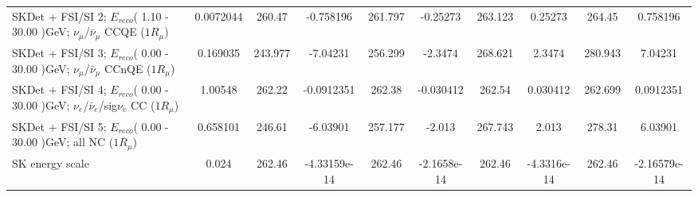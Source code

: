 \begin{tabular}{| l | S | S  S | S  S | S  S | S  S | }
SKDet + FSI/SI  2; $E_{reco}$( 1.10 - 30.00 )GeV; $\nu_{\mu}$/$\bar{\nu}_{\mu}$ CCQE ($1R_{\mu}$) &       0.0072044 &          260.47 &       -0.758196 &         261.797 &        -0.25273 &         263.123 &         0.25273 &          264.45 &        0.758196 \\ 
SKDet + FSI/SI  3; $E_{reco}$( 0.00 - 30.00 )GeV; $\nu_{\mu}$/$\bar{\nu}_{\mu}$ CCnQE ($1R_{\mu}$) &        0.169035 &         243.977 &        -7.04231 &         256.299 &         -2.3474 &         268.621 &          2.3474 &         280.943 &         7.04231 \\ 
SKDet + FSI/SI  4; $E_{reco}$( 0.00 - 30.00 )GeV; $\nu_{e}$/$\bar{\nu}_{e}$/sig$\nu_{e}$ CC ($1R_{\mu}$) &         1.00548 &          262.22 &      -0.0912351 &          262.38 &       -0.030412 &          262.54 &        0.030412 &         262.699 &       0.0912351 \\ 
           SKDet + FSI/SI  5; $E_{reco}$( 0.00 - 30.00 )GeV; all NC ($1R_{\mu}$) &        0.658101 &          246.61 &        -6.03901 &         257.177 &          -2.013 &         267.743 &           2.013 &          278.31 &         6.03901 \\ 
                                                                 SK energy scale &           0.024 &          262.46 &    -4.33159e-14 &          262.46 &     -2.1658e-14 &          262.46 &     -4.3316e-14 &          262.46 &    -2.16579e-14 \\ 
\bottomrule
\end{tabular}
